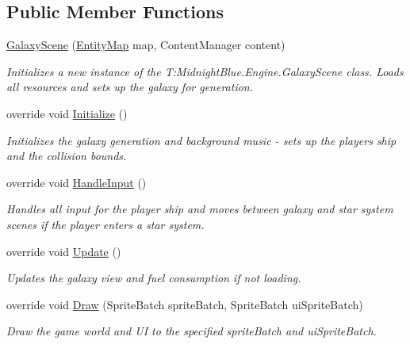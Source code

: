 \subsection*{Public Member Functions}
\begin{DoxyCompactItemize}
\item 
\hyperlink{class_midnight_blue_1_1_galaxy_scene_acdd82e3464ea18ca77bcf4694e9803a5}{Galaxy\+Scene} (\hyperlink{class_midnight_blue_1_1_engine_1_1_entity_component_1_1_entity_map}{Entity\+Map} map, Content\+Manager content)
\begin{DoxyCompactList}\small\item\em Initializes a new instance of the T\+:\+Midnight\+Blue.\+Engine.\+Galaxy\+Scene class. Loads all resources and sets up the galaxy for generation. \end{DoxyCompactList}\item 
override void \hyperlink{class_midnight_blue_1_1_galaxy_scene_a97d97e56a73d9a4b7caf6dd6ce86647e}{Initialize} ()
\begin{DoxyCompactList}\small\item\em Initializes the galaxy generation and background music -\/ sets up the players ship and the collision bounds. \end{DoxyCompactList}\item 
override void \hyperlink{class_midnight_blue_1_1_galaxy_scene_afd7f8c9f6d0cf6ded10299d4b0015c29}{Handle\+Input} ()
\begin{DoxyCompactList}\small\item\em Handles all input for the player ship and moves between galaxy and star system scenes if the player enters a star system. \end{DoxyCompactList}\item 
override void \hyperlink{class_midnight_blue_1_1_galaxy_scene_a9dfa66406143ed20f4d534c768f05a78}{Update} ()
\begin{DoxyCompactList}\small\item\em Updates the galaxy view and fuel consumption if not loading. \end{DoxyCompactList}\item 
override void \hyperlink{class_midnight_blue_1_1_galaxy_scene_a3646fcf97e067bac267d42aad66e71c4}{Draw} (Sprite\+Batch sprite\+Batch, Sprite\+Batch ui\+Sprite\+Batch)
\begin{DoxyCompactList}\small\item\em Draw the game world and UI to the specified sprite\+Batch and ui\+Sprite\+Batch. \end{DoxyCompactList}\item 

\end{DoxyCompactItemize}

